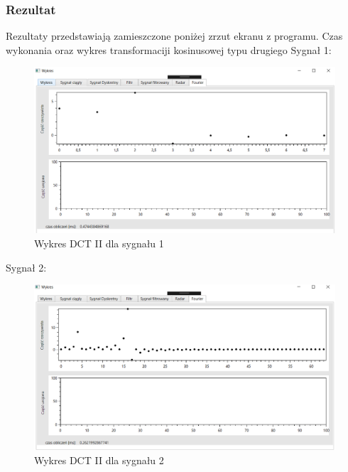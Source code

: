 \documentclass[12pt]{article}
\begin{document}
\subsubsection{Rezultat}

Rezultaty przedstawiają zamieszczone poniżej zrzut ekranu z programu. Czas wykonania oraz wykres transformaciji kosinusowej typu drugiego
\newpage
 Sygnał 1:
\begin{figure}[h!]
 \centering
 \includegraphics[width=12.3cm]{s13DCT2.PNG}
 \vspace{-0.3cm}
 \caption{Wykres DCT II dla sygnału 1}
 \label{Wykres dla wynikw eksperymentu pierwszego}
\end{figure}

Sygnał 2:
\begin{figure}[h!]
 \centering
 \includegraphics[width=12.3cm]{s16DCT2.PNG}
 \vspace{-0.3cm}
 \caption{Wykres DCT II dla sygnału 2}
 \label{Wykres dla wynikw eksperymentu pierwszego}
\end{figure}
\end{document}
